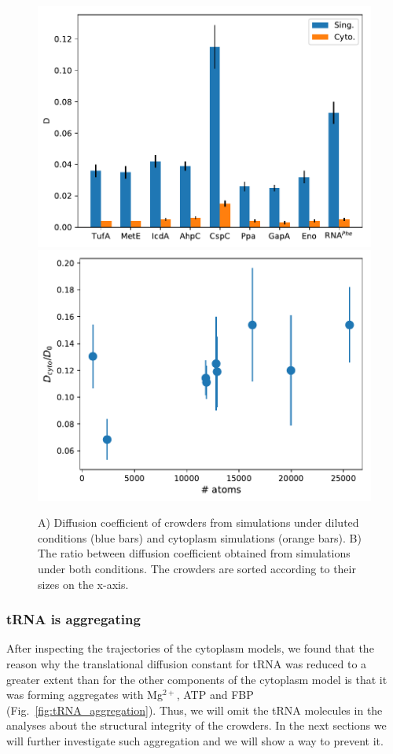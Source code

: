 \documentclass[journal=jpcisd8,manuscript=article]{achemso}
\begin{document}
\begin{figure}[H]
\includegraphics[scale=0.5]{msd.pdf}
\includegraphics[scale=0.5]{diff_cyto_over_singles.pdf}
\caption{A) Diffusion coefficient of crowders from simulations under
  diluted conditions (blue bars) and cytoplasm simulations (orange
  bars). B) The ratio between diffusion coefficient obtained from
  simulations under both conditions. The crowders are sorted according
  to their sizes on the x-axis.}
\label{fig:translational_diffusion}
\end{figure}

\subsubsection{tRNA is aggregating}
After inspecting the trajectories of the cytoplasm models, we found
that the reason why the translational diffusion constant for tRNA was
reduced to a greater extent than for the other components of the
cytoplasm model is that it was forming aggregates with Mg$^{2+}$, ATP
and FBP (Fig.~\ref{fig:tRNA_aggregation}). Thus, we will omit the tRNA
molecules in the analyses about the structural integrity of the
crowders. In the next sections we will further investigate such
aggregation and we will show a way to prevent it.
\end{document}
